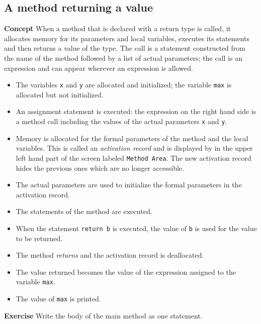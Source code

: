 \subsection{A method returning a value}\label{method.02}

\textbf{Concept} When a method that is declared with a return type is called,
it allocates memory for its parameters and local variables, executes
its statements and then returns a value of the type. 
The call is a statement constructed
from the name of the method followed by a list of actual parameters;
the call is an expression and can appear wherever an expression is allowed.


\begin{itemize}
\item The variables \texttt{x} and \texttt{y} are allocated and initialized;
the variable \texttt{max} is allocated but not initialized.
\item An assignment statement is executed: the expression on the right hand side is
a method call including the values of the actual parameters \texttt{x} and \texttt{y}.
\item Memory is allocated for the formal parameters of the method and the local variables.
This is called an \emph{activation record} and is displayed by \jel{} in the upper left
hand part of the screen labeled \texttt{Method Area}. The new activation record hides
the previous ones which are no longer accessible.
\item The actual parameters are used to initialize the formal parameters in the activation
record.
\item The statements of the method are executed.
\item When the statement \texttt{return b} is executed, the value of \texttt{b} is used
for the value to be returned.
\item The method \emph{returns} and the activation record is deallocated.
\item The value returned becomes the value of the expression assigned to the
variable \texttt{max}.
\item The value of \texttt{max} is printed.
\end{itemize}

\textbf{Exercise} Write the body of the main method as one statement.
